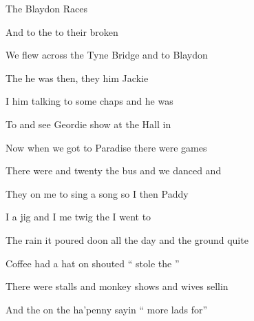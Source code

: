 \begin{SBSong}{The Blaydon Races}
\begin{SBVerse}
    And  to the  to  their broken 
  \end{SBVerse}
  \begin{SBVerse}
    We flew across the Tyne Bridge and  to Blaydon 
    
    The  he was  then, they  him Jackie 
    
    I  him talking to some chaps and  he was 
    
    To  and see Geordie  show at the  Hall in 
  \end{SBVerse}
  \CBPageBrk
  \begin{SBVerse}
    Now when we got to Paradise there were  games 
    
    There were  and twenty  the bus and  we danced and 
    
    They  on me to sing a song so I  then Paddy 
    
    I  a jig and I  me twig the  I went to 
  \end{SBVerse}
  \begin{SBVerse}
    The rain it poured doon all the day and  the ground quite 
    
    Coffee  had a  hat on shouted `` stole the ''
    
    There were  stalls and monkey shows and  wives sellin 
    
    And the  on the ha'penny  sayin `` more lads for''
  \end{SBVerse}
\end{SBSong}


